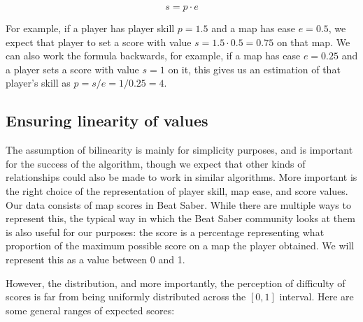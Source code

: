 \documentclass[12pt,a4paper]{article}
\begin{document}
\begin{equation}
\label{bilinear_relation}
s = p \cdot e
\end{equation}

For example, if a player has player skill $p = 1.5$ and a map has ease $e = 0.5$, we expect that player to set a score with value $s = 1.5 \cdot 0.5 = 0.75$ on that map. We can also work the formula backwards, for example, if a map has ease $e = 0.25$ and a player sets a score with value $s = 1$ on it, this gives us an estimation of that player's skill as $p = s / e = 1 / 0.25 = 4$.\\

\subsection{Ensuring linearity of values}

The assumption of bilinearity is mainly for simplicity purposes, and is important for the success of the algorithm, though we expect that other kinds of relationships could also be made to work in similar algorithms. More important is the right choice of the representation of player skill, map ease, and score values. Our data consists of map scores in Beat Saber. While there are multiple ways to represent this, the typical way in which the Beat Saber community looks at them is also useful for our purposes: the score is a percentage representing what proportion of the maximum possible score on a map the player obtained. We will represent this as a value between 0 and 1. 

However, the distribution, and more importantly, the perception of difficulty of scores is far from being uniformly distributed across the $[0,1]$ interval. Here are some general ranges of expected scores:
\end{document}
